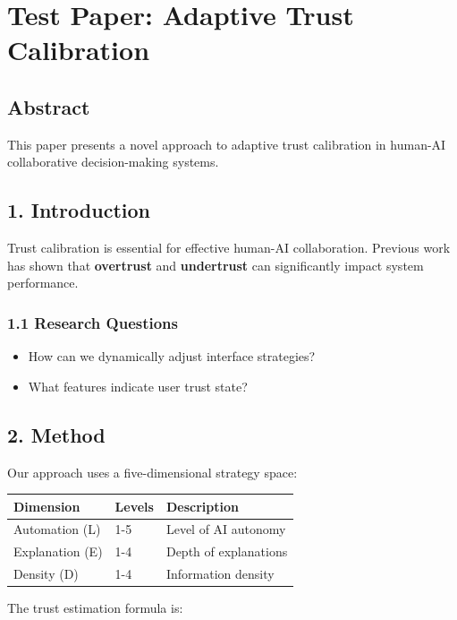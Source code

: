 \section{Test Paper: Adaptive Trust Calibration}\label{sec:test_paper__adaptive_trust_calibration}

\subsection{Abstract}

This paper presents a novel approach to adaptive trust calibration in human-AI collaborative decision-making systems.

\subsection{1. Introduction}

Trust calibration is essential for effective human-AI collaboration. Previous work has shown that \textbf{overtrust} and \textbf{undertrust} can significantly impact system performance.

\subsubsection{1.1 Research Questions}
\begin{itemize}
\item How can we dynamically adjust interface strategies?
\item What features indicate user trust state?
\end{itemize}

\subsection{2. Method}

Our approach uses a five-dimensional strategy space:

\begin{table}[h]
\centering
\begin{tabular}{lll}
\toprule
Dimension & Levels & Description \\
\midrule
Automation (L) & 1-5 & Level of AI autonomy \\
Explanation (E) & 1-4 & Depth of explanations \\
Density (D) & 1-4 & Information density \\
\bottomrule
\end{tabular}
\end{table}
The trust estimation formula is:

